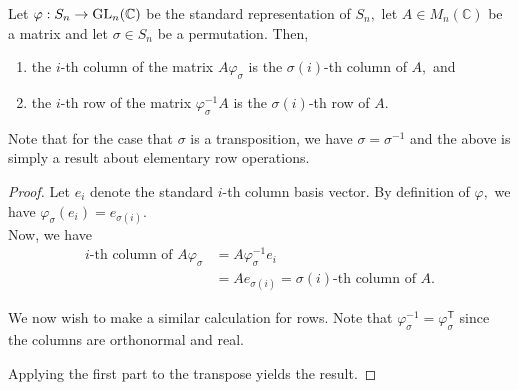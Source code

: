 \begin{lem} \label{lem:rowcoloperations}
	Let $\varphi : S_n \to \operatorname{GL}_n(\mathbb{C})$ be the standard representation of $S_n,$ let $A \in M_n(\mathbb{C})$ be a matrix and let $\sigma \in S_n$ be a permutation. Then,
	\begin{enumerate}
		\item  the $i$-th column of the matrix $A\varphi_\sigma$ is the $\sigma(i)$-th column of $A,$ and
		\item the $i$-th row of the matrix $\varphi_\sigma^{-1}A$ is the $\sigma(i)$-th row of $A.$
	\end{enumerate}
\end{lem}
Note that for the case that $\sigma$ is a transposition, we have $\sigma = \sigma^{-1}$ and the above is simply a result about elementary row operations.
\begin{proof} 
	Let $e_i$ denote the standard $i$-th column basis vector. By definition of $\varphi,$ we have $\varphi_\sigma(e_i) = e_{\sigma(i)}.$ \\
	Now, we have
	\begin{align*} 
		i\text{-th column of }A\varphi_\sigma &= A\varphi_\sigma^{-1}e_i\\
		&= Ae_{\sigma(i)} = \sigma(i)\text{-th column of }A.
	\end{align*}
	
	We now wish to make a similar calculation for rows. Note that $\varphi_\sigma^{-1} = \varphi_\sigma^\mathsf{T}$ since the columns are orthonormal and real.

	Applying the first part to the transpose yields the result.
\end{proof}

